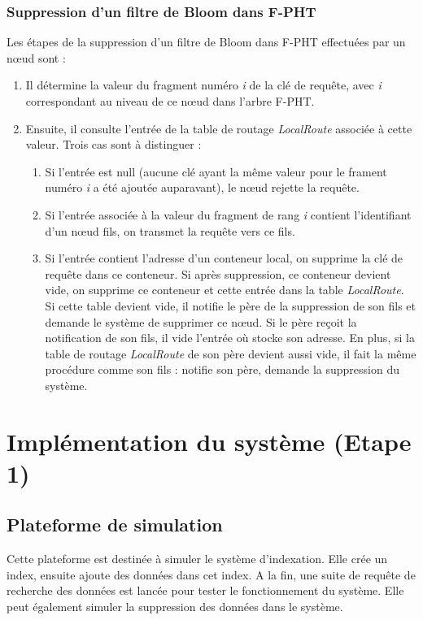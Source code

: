 \documentclass[a4paper,11pt]{report}
\begin{document}
\subsection{Suppression d'un filtre de Bloom dans F-PHT}
	Les étapes de la suppression d'un filtre de Bloom dans F-PHT effectuées par un nœud sont :
	\begin{enumerate}
		\item Il détermine la valeur du fragment numéro \textit{i} de la clé de requête, avec \textit{i} correspondant au niveau de ce nœud dans l'arbre F-PHT.
		\item Ensuite, il consulte l'entrée de la table de routage \textit{LocalRoute} associée à cette valeur. Trois cas sont à distinguer :
		\begin{enumerate}
			\item Si l'entrée est null (aucune clé ayant la même valeur pour le frament numéro \textit{i} a été ajoutée auparavant), le nœud rejette la requête.
			\item Si l'entrée associée à la valeur du fragment de rang \textit{i} contient l'identifiant d'un nœud fils, on transmet la requête vers ce fils.
			\item Si l'entrée contient l'adresse d'un conteneur local, on supprime la clé de requête dans ce conteneur. Si après suppression, ce conteneur devient vide, on supprime ce conteneur et cette entrée dans la table \textit{LocalRoute}. Si cette table devient vide, il notifie le père de la suppression de son fils et demande le système de supprimer ce nœud. Si le père reçoit la notification de son fils, il vide l'entrée où stocke son adresse. En plus, si la table de routage \textit{LocalRoute} de son père devient aussi vide, il fait la même procédure comme son fils : notifie son père, demande la suppression du système.
		\end{enumerate}
	\end{enumerate}

\chapter{Implémentation du système (Etape 1)}
\section{Plateforme de simulation}
	Cette plateforme est destinée à simuler le système d'indexation. Elle crée un index, ensuite ajoute des données dans cet index. A la fin, une suite de requête de recherche des données est lancée pour tester le fonctionnement du système. Elle peut également simuler la suppression des données dans le système.
		
\end{document}
